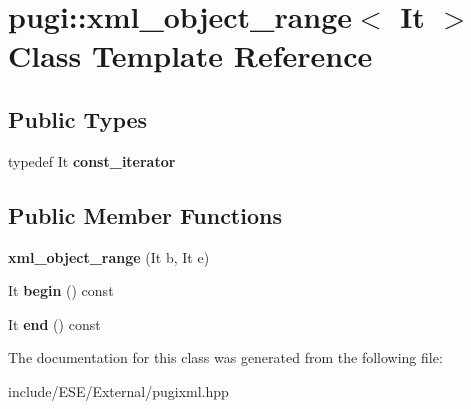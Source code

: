 \hypertarget{classpugi_1_1xml__object__range}{\section{pugi\-:\-:xml\-\_\-object\-\_\-range$<$ It $>$ Class Template Reference}
\label{classpugi_1_1xml__object__range}
}
\subsection*{Public Types}
\begin{DoxyCompactItemize}
\item 
\hypertarget{classpugi_1_1xml__object__range_ace38fcf448c7134e13612f7ce439246c}{typedef It {\bfseries const\-\_\-iterator}}\label{classpugi_1_1xml__object__range_ace38fcf448c7134e13612f7ce439246c}

\end{DoxyCompactItemize}
\subsection*{Public Member Functions}
\begin{DoxyCompactItemize}
\item 
\hypertarget{classpugi_1_1xml__object__range_abf214db65eac081e4478169cb03bce67}{{\bfseries xml\-\_\-object\-\_\-range} (It b, It e)}\label{classpugi_1_1xml__object__range_abf214db65eac081e4478169cb03bce67}

\item 
\hypertarget{classpugi_1_1xml__object__range_ad8d64cefea10330a0f975fbb13a99a8a}{It {\bfseries begin} () const }\label{classpugi_1_1xml__object__range_ad8d64cefea10330a0f975fbb13a99a8a}

\item 
\hypertarget{classpugi_1_1xml__object__range_ad2c9b91aca1c3d4761c767af29a9d7ff}{It {\bfseries end} () const }\label{classpugi_1_1xml__object__range_ad2c9b91aca1c3d4761c767af29a9d7ff}

\end{DoxyCompactItemize}


The documentation for this class was generated from the following file\-:\begin{DoxyCompactItemize}
\item 
include/\-E\-S\-E/\-External/pugixml.\-hpp\end{DoxyCompactItemize}
